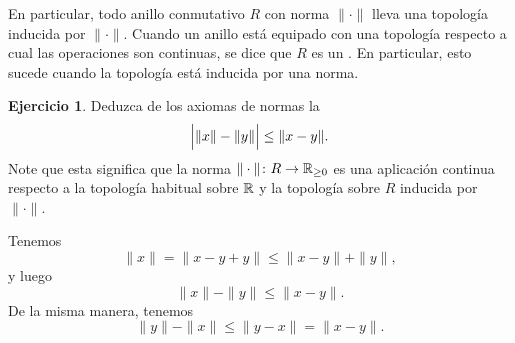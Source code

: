 \documentclass{article}
\numberwithin{equation}{section}
\theoremstyle{definition}
\newtheorem{ejerc}{Ejercicio}
\begin{document}
En particular, todo anillo conmutativo $R$ con norma $\|\cdot\|$ lleva
una topología inducida por $\|\cdot\|$. Cuando un anillo está equipado con
una topología respecto a cual las operaciones son continuas, se dice que $R$
es un . En particular, esto sucede cuando la topología
está inducida por una norma.

\begin{ejerc}
  Deduzca de los axiomas de normas la 
  $$\Bigl|\|x\|-\|y\|\Bigr| \le \|x-y\|.$$
  Note que esta significa que la norma $\|\cdot\|\colon R\to \mathbb{R}_{\ge 0}$
  es una aplicación continua respecto a la topología habitual sobre $\mathbb{R}$
  y la topología sobre $R$ inducida por $\|\cdot\|$.

  \ifdefined\solutions\begin{solucion}
    Tenemos
    $$\|x\| = \|x - y + y\| \le \|x-y\| + \|y\|,$$
    y luego
    $$\|x\| - \|y\| \le \|x-y\|.$$
    De la misma manera, tenemos
    $$\|y\| - \|x\| \le \|y-x\| = \|x-y\|.$$
  \end{solucion}\fi
\end{ejerc}
\end{document}
